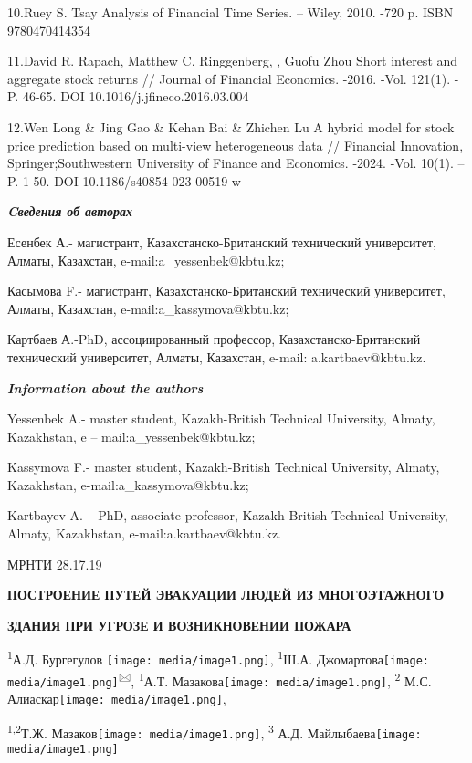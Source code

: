 \documentclass[
]{article}
\begin{document}
10.Ruey S. Tsay Analysis of Financial Time Series. -- Wiley, 2010. -720
p. ISBN 9780470414354

11.David R. Rapach, Matthew C. Ringgenberg, , Guofu Zhou Short interest
and aggregate stock returns // Journal of Financial Economics. -2016.
-Vol. 121(1). -P. 46-65. DOI 10.1016/j.jfineco.2016.03.004

12.Wen Long \& Jing Gao \& Kehan Bai \& Zhichen Lu A hybrid model for
stock price prediction based on multi-view heterogeneous data //
Financial Innovation, Springer;Southwestern University of Finance and
Economics. -2024. -Vol. 10(1). --P. 1-50. DOI 10.1186/s40854-023-00519-w

\emph{\textbf{Cведения об авторах}}

Есенбек А.- магистрант, Казахстанско-Британский технический университет,
Алматы, Казахстан, e-mail:a\_yessenbek@kbtu.kz;

Касымова F.- магистрант, Казахстанско-Британский технический
университет, Алматы, Казахстан, e-mail:a\_kassymova@kbtu.kz;

Картбаев А.-PhD, ассоциированный профессор, Казахстанско-Британский
технический университет, Алматы, Казахстан, e-mail: a.kartbaev@kbtu.kz.

\emph{\textbf{Information about the authors}}

Yessenbek A.- master student, Kazakh-British Technical University,
Almaty, Kazakhstan, e -- mail:a\_yessenbek@kbtu.kz;

Kassymova F.- master student, Kazakh-British Technical University,
Almaty, Kazakhstan, e-mail:a\_kassymova@kbtu.kz;

Kartbayev A. -- PhD, associate professor, Kazakh-British Technical
University, Almaty, Kazakhstan, e-mail:a.kartbaev@kbtu.kz.

МРНТИ 28.17.19

\textbf{ПОСТРОЕНИЕ ПУТЕЙ ЭВАКУАЦИИ ЛЮДЕЙ ИЗ МНОГОЭТАЖНОГО}

\textbf{ЗДАНИЯ ПРИ УГРОЗЕ И ВОЗНИКНОВЕНИИ ПОЖАРА}

\textsuperscript{1}А.Д. Бургегулов
\texttt{[image: media/image1.png]},
\textsuperscript{1}Ш.А.
Джомартова\texttt{[image: media/image1.png]}\textsuperscript{🖂},
\textsuperscript{1}А.Т.
Мазакова\texttt{[image: media/image1.png]},
\textsuperscript{2} М.С.
Алиаскар\texttt{[image: media/image1.png]},

\textsuperscript{1,2}Т.Ж.
Мазаков\texttt{[image: media/image1.png]},
\textsuperscript{3} А.Д.
Майлыбаева\texttt{[image: media/image1.png]}
\end{document}
